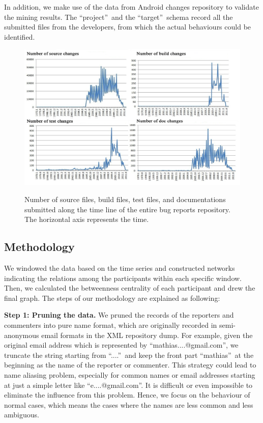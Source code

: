 \documentclass[10pt, conference, compsocconf]{IEEEtran}
\begin{document}
In addition, we make use of the data from Android changes repository to validate the mining results. The \textquotedblleft project\textquotedblright \ and the \textquotedblleft target\textquotedblright \ schema record all the submitted files from the developers, from which the actual behaviours could be identified.

\begin{figure}[ht]
\centering
\includegraphics[width=13cm]{2010-2011.png}
\label{2010-2011}
\caption{Number of source files, build files, test files, and documentations submitted along the time line of the entire bug reports repository. The horizontal axis represents the time.}
\end{figure}


\subsection{Methodology}
We windowed the data based on the time series and constructed networks indicating the relations among the participants within each specific window. Then, we calculated the betweenness centrality of each participant and drew the final graph. The steps of our methodology are explained as following:

\textbf{Step 1: Pruning the data.} We pruned the records of the reporters and commenters into pure name format, which are originally recorded in semi-anonymous email formats in the XML repository dump. For example, given the original email address which is represented by \textquotedblleft mathias....@gmail.com\textquotedblright, we truncate the string starting from \textquotedblleft ....\textquotedblright \ and keep the front part \textquotedblleft mathias\textquotedblright \ at the beginning as the name of the reporter or commenter. This strategy could lead to name aliasing problem, especially for common names or email addresses starting at just a simple letter like \textquotedblleft e....@gmail.com\textquotedblright. It is difficult or even impossible to eliminate the influence from this problem. Hence, we focus on the behaviour of normal cases, which means the cases where the names are less common and less ambiguous.
\end{document}
